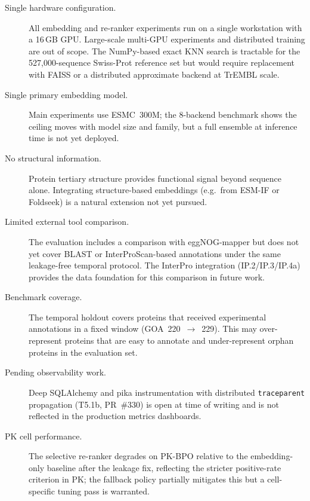 \begin{description}
  \item[Single hardware configuration.] All embedding and re-ranker experiments
    run on a single workstation with a 16\,GB GPU. Large-scale multi-GPU
    experiments and distributed training are out of scope. The NumPy-based exact
    KNN search is tractable for the 527,000-sequence Swiss-Prot reference set
    but would require replacement with FAISS or a distributed approximate
    backend at TrEMBL scale.

  \item[Single primary embedding model.] Main experiments use ESMC~300M; the
    8-backend benchmark shows the ceiling moves with model size and family, but
    a full ensemble at inference time is not yet deployed.

  \item[No structural information.] Protein tertiary structure provides
    functional signal beyond sequence alone. Integrating structure-based
    embeddings (e.g.\ from ESM-IF or Foldseek) is a natural extension not yet
    pursued.

  \item[Limited external tool comparison.] The evaluation includes a comparison
    with eggNOG-mapper but does not yet cover BLAST or InterProScan-based
    annotations under the same leakage-free temporal protocol. The InterPro
    integration (IP.2/IP.3/IP.4a) provides the data foundation for this
    comparison in future work.

  \item[Benchmark coverage.] The temporal holdout covers proteins that received
    experimental annotations in a fixed window (GOA~220~$\to$~229). This may
    over-represent proteins that are easy to annotate and under-represent orphan
    proteins in the evaluation set.

  \item[Pending observability work.] Deep SQLAlchemy and pika instrumentation
    with distributed \texttt{traceparent} propagation (T5.1b, PR~\#330) is open
    at time of writing and is not reflected in the production metrics dashboards.

  \item[PK cell performance.] The selective re-ranker degrades on PK-BPO
    relative to the embedding-only baseline after the leakage fix, reflecting
    the stricter positive-rate criterion in PK; the fallback policy partially
    mitigates this but a cell-specific tuning pass is warranted.
\end{description}

